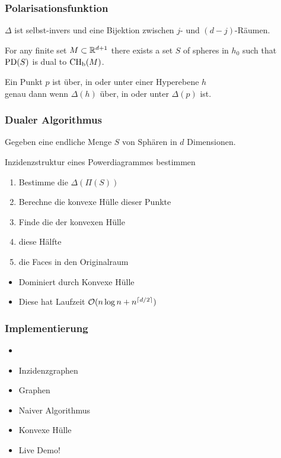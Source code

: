 \begin{frame}
    \frametitle{Polarisationsfunktion}

    \begin{lemma}
        $\Delta$ ist selbst-invers und eine Bijektion zwischen $j$- und $(d-j)$-Räumen.
    \end{lemma}

    \vfill

    \begin{theorem}
        For any finite set $M \subset \mathbb{R}^{d+1}$ there exists a set $S$ of spheres in $h_0$ such that $\operatorname{PD}(S)$ is dual to $\operatorname{CH_b}(M)$.
    \end{theorem}

    \begin{lemma}
        Ein Punkt $p$ ist über, in oder unter einer Hyperebene $h$\\ genau dann wenn $\Delta(h)$ über, in oder unter $\Delta(p)$ ist.
    \end{lemma}
\end{frame}


\begin{frame}
    \frametitle{Dualer Algorithmus}

    Gegeben eine endliche Menge $S$ von Sphären in $d$ Dimensionen.

    \vfill

    \begin{block}{Inzidenzstruktur eines Powerdiagrammes bestimmen}
        \begin{enumerate}
            \item Bestimme die  $\Delta(\Pi(S))$
            \item Berechne die \alert{konvexe Hülle} dieser Punkte
            \item Finde die  der konvexen Hülle
            \item {} diese Hälfte
            \item {} die Faces in den Originalraum
        \end{enumerate}
    \end{block}

    \vfill

    \begin{itemize}
        \item Dominiert durch Konvexe Hülle
        \item Diese hat Laufzeit $\mathcal{O}(n \log n + n^{\left\lceil d/2\right\rceil})$
    \end{itemize}
\end{frame}

\begin{frame}
    \frametitle{Implementierung}

    \begin{itemize}
        \item \CCe
        \item Inzidenzgraphen
        \item Graphen
        \item Naiver Algorithmus
        \item Konvexe Hülle
        \item Live Demo!
    \end{itemize}
\end{frame}



